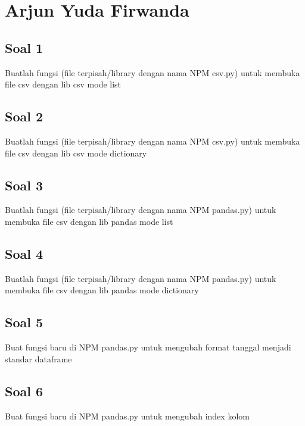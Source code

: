 \section{Arjun Yuda Firwanda}
\subsection{Soal 1}
Buatlah fungsi (file terpisah/library dengan nama NPM csv.py) untuk membuka file csv dengan lib csv mode list


\subsection{Soal 2}
Buatlah fungsi (file terpisah/library dengan nama NPM csv.py) untuk membuka file csv dengan lib csv mode dictionary


\subsection{Soal 3}
Buatlah fungsi (file terpisah/library dengan nama NPM pandas.py) untuk membuka file csv dengan lib pandas mode list


\subsection{Soal 4}
Buatlah fungsi (file terpisah/library dengan nama NPM pandas.py) untuk membuka file csv dengan lib pandas mode dictionary


\subsection{Soal 5}
Buat fungsi baru di NPM pandas.py untuk mengubah format tanggal menjadi standar dataframe


\subsection{Soal 6}
Buat fungsi baru di NPM pandas.py untuk mengubah index kolom


